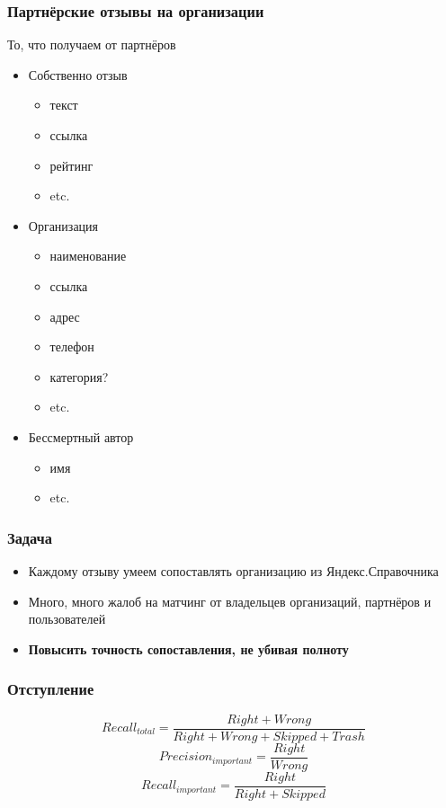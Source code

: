 \documentclass{beamer}
\begin{document}
\begin{frame} \frametitle{Партнёрские отзывы на организации}
	То, что получаем от партнёров
	\begin{itemize}
	\item Собственно отзыв
		\begin{itemize}
		\item текст \item ссылка \item рейтинг  \item etc.
		\end{itemize}
	\item Организация
		\begin{itemize}
		\item наименование \item ссылка	\item адрес \item телефон \item категория?  \item etc.
		\end{itemize}
	\item Бессмертный автор
		\begin{itemize}
		\item имя \item etc.
		\end{itemize}
	\end{itemize}
\end{frame}


\begin{frame}\frametitle{Задача}
	\begin{itemize}
		\item Каждому отзыву умеем сопоставлять организацию из Яндекс.Справочника
		\item Много, много жалоб на матчинг от владельцев организаций, партнёров и пользователей
		\item<2> \textbf{Повысить точность сопоставления, не убивая полноту}
	\end{itemize}
\end{frame}

\begin{frame}\frametitle{Отступление}
\begin{figure}[ht]
\begin{center}
\end{center}
\end{figure}
$$Recall_{total} = \frac{Right + Wrong}{Right + Wrong + Skipped + Trash}$$
$$Precision_{important} = \frac{Right}{Wrong}$$
$$Recall_{important} = \frac{Right}{Right + Skipped}$$
\end{frame}
\end{document}
